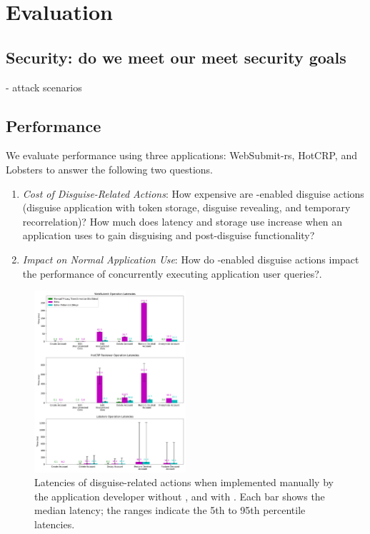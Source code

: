 \section{Evaluation}
\subsection{Security: do we meet our meet security goals}
   - attack scenarios

\subsection{Performance}

We evaluate performance using three applications: WebSubmit-rs, HotCRP, and Lobsters to answer the
following two questions.
\begin{enumerate}
    \item \emph{Cost of Disguise-Related Actions}: How expensive are \sys-enabled disguise actions
(disguise application with token storage, disguise revealing, and temporary recorrelation)?
How much does latency and storage use increase when an application uses \sys
to gain disguising and post-disguise functionality?
\item \emph{Impact on Normal Application Use}: How do \sys-enabled disguise actions impact the performance of concurrently executing
application user queries?.
\end{enumerate}

\begin{figure}[h!]
    \centering
        \includegraphics[width=0.5\textwidth]{figs/client_op_stats}
    \caption{Latencies of disguise-related actions when implemented manually by the application
    developer without \sys, and with \sys.
    Each bar shows the median latency; the ranges indicate the 5th to 95th percentile latencies.
    } 
    \label{fig:client_opstats}
\end{figure}

